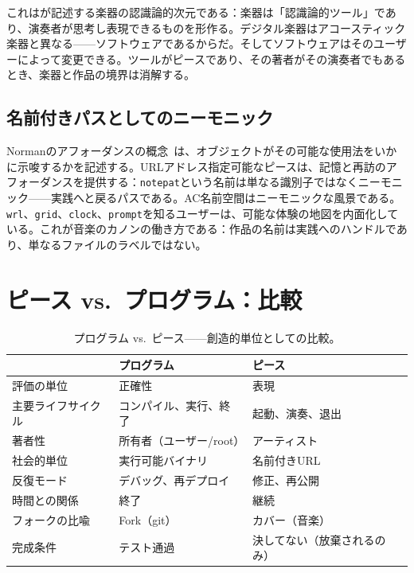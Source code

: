 \documentclass[10pt,letterpaper,twocolumn]{article}
\begin{document}
これは\citet{magnusson2010designing}が記述する楽器の認識論的次元である：楽器は「認識論的ツール」であり、演奏者が思考し表現できるものを形作る。デジタル楽器はアコースティック楽器と異なる——ソフトウェアであるからだ。そしてソフトウェアはそのユーザーによって変更できる。ツールがピースであり、その著者がその演奏者でもあるとき、楽器と作品の境界は消解する。

\subsection{名前付きパスとしてのニーモニック}

Normanのアフォーダンスの概念~\citep{norman1988design}は、オブジェクトがその可能な使用法をいかに示唆するかを記述する。URLアドレス指定可能なピースは、記憶と再訪のアフォーダンスを提供する：\texttt{notepat}という名前は単なる識別子ではなくニーモニック——実践へと戻るパスである。AC名前空間はニーモニックな風景である。\texttt{wrl}、\texttt{grid}、\texttt{clock}、\texttt{prompt}を知るユーザーは、可能な体験の地図を内面化している。これが音楽のカノンの働き方である：作品の名前は実践へのハンドルであり、単なるファイルのラベルではない。

\section{ピース vs.\ プログラム：比較}

\begin{table}[h]
\small
\centering
\begin{tabularx}{\columnwidth}{l X X}
\toprule
 & \textbf{プログラム} & \textbf{ピース} \\
\midrule
評価の単位 & 正確性 & 表現 \\
主要ライフサイクル & コンパイル、実行、終了 & 起動、演奏、退出 \\
著者性 & 所有者（ユーザー/root） & アーティスト \\
社会的単位 & 実行可能バイナリ & 名前付きURL \\
反復モード & デバッグ、再デプロイ & 修正、再公開 \\
時間との関係 & 終了 & 継続 \\
フォークの比喩 & Fork（git） & カバー（音楽） \\
完成条件 & テスト通過 & 決してない（放棄されるのみ） \\
\bottomrule
\end{tabularx}
\caption{プログラム vs.\ ピース——創造的単位としての比較。}
\label{tab:comparison}
\end{table}
\end{document}
